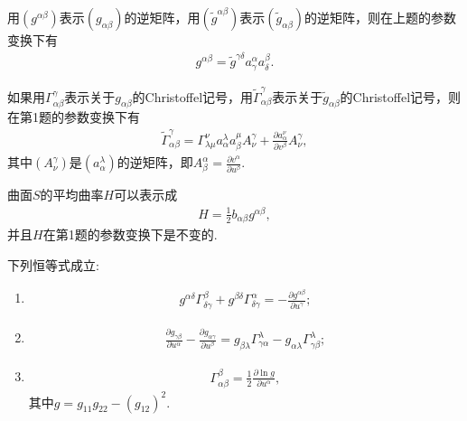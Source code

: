 \documentclass[../../main.tex]{subfiles}%
\begin{document}
\begin{example}
用$(g^{\alpha\beta})$表示$(g_{\alpha\beta})$的逆矩阵，用$(\tilde{g}^{\alpha\beta})$表示$(\tilde{g}_{\alpha\beta})$的逆矩阵，则在上题的参数变换下有
\begin{align*}
g^{\alpha\beta} = \tilde{g}^{\gamma\delta}a^\alpha_\gamma a^\beta_\delta.
\end{align*}

\end{example}

\begin{example}
如果用$\Gamma^\gamma_{\alpha\beta}$表示关于$g_{\alpha\beta}$的Christoffel记号，用$\tilde{\Gamma}^\gamma_{\alpha\beta}$表示关于$\tilde{g}_{\alpha\beta}$的Christoffel记号，则在第1题的参数变换下有
\begin{align*}
\tilde{\Gamma}^\gamma_{\alpha\beta} = \Gamma^\nu_{\lambda\mu}a^\lambda_\alpha a^\mu_\beta A^\gamma_\nu + \frac{\partial a^\nu_\alpha}{\partial v^\beta}A^\gamma_\nu,
\end{align*}
其中$(A^\gamma_\nu)$是$(a^\lambda_\alpha)$的逆矩阵，即$A^\alpha_\beta = \frac{\partial v^\alpha}{\partial u^\beta}$.

\end{example}

\begin{example}
曲面$S$的平均曲率$H$可以表示成
\begin{align*}
H = \frac{1}{2}b_{\alpha\beta}g^{\alpha\beta},
\end{align*}
并且$H$在第1题的参数变换下是不变的.

\end{example}

\begin{example}
下列恒等式成立:
\begin{enumerate}[(1)]
\item \begin{align*}
g^{\alpha\delta}\Gamma^\beta_{\delta\gamma} + g^{\beta\delta}\Gamma^\alpha_{\delta\gamma} = -\frac{\partial g^{\alpha\beta}}{\partial u^\gamma};
\end{align*}
\item \begin{align*}
\frac{\partial g_{\gamma\beta}}{\partial u^\alpha} - \frac{\partial g_{\alpha\gamma}}{\partial u^\beta} = g_{\beta\lambda}\Gamma^\lambda_{\gamma\alpha} - g_{\alpha\lambda}\Gamma^\lambda_{\gamma\beta};
\end{align*}
\item \begin{align*}
\Gamma^\beta_{\alpha\beta} = \frac{1}{2}\frac{\partial\ln g}{\partial u^\alpha},
\end{align*}
其中$g = g_{11}g_{22} - (g_{12})^2$.
\end{enumerate}

\end{example}
\end{document}
